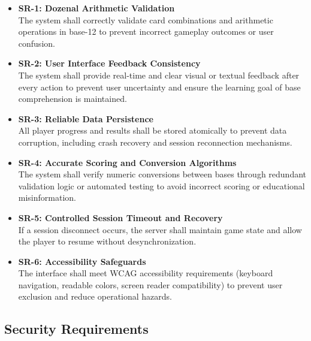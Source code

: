 \documentclass{article}
\begin{document}
\begin{itemize}
  \item \textbf{SR-1: Dozenal Arithmetic Validation}
  \\The system shall correctly validate card combinations and arithmetic 
  operations in base-12 to prevent incorrect gameplay outcomes or user 
  confusion.

  \item \textbf{SR-2: User Interface Feedback Consistency}
  \\The system shall provide real-time and clear visual or textual feedback 
  after every action to prevent user uncertainty and ensure the learning goal 
  of base comprehension is maintained.

  \item \textbf{SR-3: Reliable Data Persistence}
  \\All player progress and results shall be stored atomically to prevent data 
  corruption, including crash recovery and session reconnection mechanisms.

  \item \textbf{SR-4: Accurate Scoring and Conversion Algorithms}
  \\The system shall verify numeric conversions between bases through redundant 
  validation logic or automated testing to avoid incorrect scoring or 
  educational misinformation.

  \item \textbf{SR-5: Controlled Session Timeout and Recovery}
  \\If a session disconnect occurs, the server shall maintain game state and 
  allow the player to resume without desynchronization.

  \item \textbf{SR-6: Accessibility Safeguards}
  \\The interface shall meet WCAG accessibility requirements (keyboard 
  navigation, readable colors, screen reader compatibility) to prevent user 
  exclusion and reduce operational hazards.
\end{itemize}

\subsection{Security Requirements}
\end{document}
